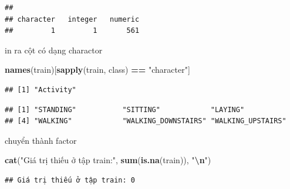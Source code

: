 \documentclass[
]{article}
\newenvironment{Shaded}{\begin{snugshade}}{\end{snugshade}}
\newcommand{\FunctionTok}[1]{\textcolor[rgb]{0.13,0.29,0.53}{\textbf{#1}}}
\newcommand{\NormalTok}[1]{#1}
\newcommand{\OtherTok}[1]{\textcolor[rgb]{0.56,0.35,0.01}{#1}}
\newcommand{\SpecialCharTok}[1]{\textcolor[rgb]{0.81,0.36,0.00}{\textbf{#1}}}
\newcommand{\StringTok}[1]{\textcolor[rgb]{0.31,0.60,0.02}{#1}}
\begin{document}
\begin{verbatim}
## 
## character   integer   numeric 
##         1         1       561
\end{verbatim}

in ra cột có dạng charactor

\begin{Shaded}
\begin{Highlighting}[]
\FunctionTok{names}\NormalTok{(train)[}\FunctionTok{sapply}\NormalTok{(train, class) }\SpecialCharTok{==} \StringTok{"character"}\NormalTok{]}
\end{Highlighting}
\end{Shaded}

\begin{verbatim}
## [1] "Activity"
\end{verbatim}

\begin{Shaded}
\end{Shaded}

\begin{verbatim}
## [1] "STANDING"           "SITTING"            "LAYING"            
## [4] "WALKING"            "WALKING_DOWNSTAIRS" "WALKING_UPSTAIRS"
\end{verbatim}

chuyển thành factor

\begin{Shaded}
\end{Shaded}

\begin{Shaded}
\begin{Highlighting}[]
\FunctionTok{cat}\NormalTok{(}\StringTok{"Giá trị thiếu ở tập train:"}\NormalTok{, }\FunctionTok{sum}\NormalTok{(}\FunctionTok{is.na}\NormalTok{(train)), }\StringTok{"}\SpecialCharTok{\textbackslash{}n}\StringTok{"}\NormalTok{)}
\end{Highlighting}
\end{Shaded}

\begin{verbatim}
## Giá trị thiếu ở tập train: 0
\end{verbatim}
\end{document}
